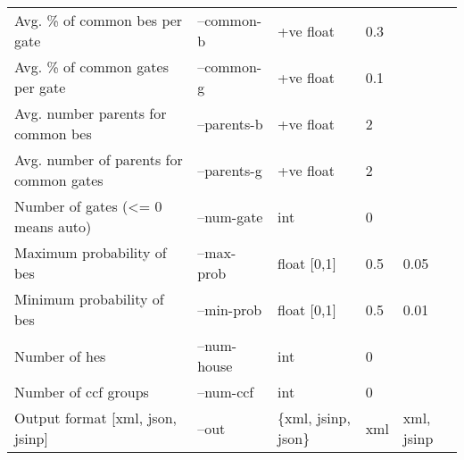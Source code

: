 \begin{longtable}{@{}lllll@{}}
Avg. \% of common \acrshort{be}s per gate     & --common-b  & +ve float       & 0.3     &             \\
Avg. \% of common gates per gate            & --common-g  & +ve float       & 0.1     &             \\
Avg. number parents for common \acrshort{be}s  & --parents-b & +ve float       & 2       &             \\
Avg. number of parents for common gates  & --parents-g & +ve float           & 2       &             \\
Number of gates (\textless{}= 0 means auto) & --num-gate  & int             & 0       &             \\
Maximum probability of \acrshort{be}s         & --max-prob & float {[}0,1{]} & 0.5     & 0.05        \\
Minimum probability of \acrshort{be}s         & --min-prob  & float {[}0,1{]} & 0.5     & 0.01        \\
Number of \acrfull{he}s                     & --num-house & int             & 0       &             \\
Number of \acrshort{ccf} groups                        & --num-ccf   & int             & 0       &             \\
Output format {[}\acrshort{xml}, \acrshort{json}, \acrshort{jsinp}{]}               & --out       & \{xml, jsinp, json\}   & xml     & xml, jsinp   \\* \bottomrule
\end{longtable}